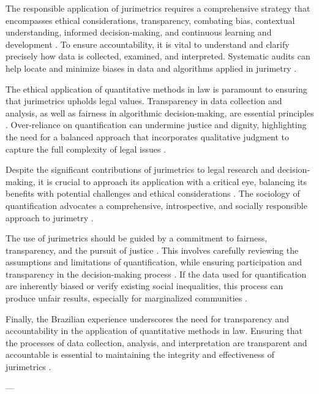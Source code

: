 The responsible application of jurimetrics requires a comprehensive strategy that encompasses ethical considerations, transparency, combating bias, contextual understanding, informed decision-making, and continuous learning and development \cite{10.1590/data.2022.65.3.267,inthelawviewmetadatacitationsimilarpapers2014}. To ensure accountability, it is vital to understand and clarify precisely how data is collected, examined, and interpreted. Systematic audits can help locate and minimize biases in data and algorithms applied in jurimetry \cite{10.1590/data.2022.65.3.267,inthelawviewmetadatacitationsimilarpapers2014}.

The ethical application of quantitative methods in law is paramount to ensuring that jurimetrics upholds legal values. Transparency in data collection and analysis, as well as fairness in algorithmic decision-making, are essential principles \cite{internalknowledgesources}. Over-reliance on quantification can undermine justice and dignity, highlighting the need for a balanced approach that incorporates qualitative judgment to capture the full complexity of legal issues \cite{internalknowledgesources}.

Despite the significant contributions of jurimetrics to legal research and decision-making, it is crucial to approach its application with a critical eye, balancing its benefits with potential challenges and ethical considerations \cite{10.1007/s11186-021-09453-1,10.1057/s41599-020-00557-0,10.1590/15174522-105471,10.1590/data.2022.65.3.267,10.3390/fi9040068,international2015,loevinger1959,10.2307/2654208,demortain2019politics,10.5040/9781350220645,10.1080/07329113.2015.1046739,10.1057/s41599-020-0396-5,comptabilitat0018,salais2016quantification,10.1017/s0003975609000150,supiot2018,nunes2016jurimetrics,de2010jurimetrics,zabala2019decades}. The sociology of quantification advocates a comprehensive, introspective, and socially responsible approach to jurimetry \cite{10.1590/data.2022.65.3.267,salais2016quantification}.

The use of jurimetrics should be guided by a commitment to fairness, transparency, and the pursuit of justice \cite{10.1177/09596801221075807,10.5040/9781350220645}. This involves carefully reviewing the assumptions and limitations of quantification, while ensuring participation and transparency in the decision-making process \cite{10.1590/data.2022.65.3.267,10.1057/s41599-020-00557-0}. If the data used for quantification are inherently biased or verify existing social inequalities, this process can produce unfair results, especially for marginalized communities \cite{10.1590/data.2022.65.3.267,10.1057/s41599-020-00557-0}.

Finally, the Brazilian experience underscores the need for transparency and accountability in the application of quantitative methods in law. Ensuring that the processes of data collection, analysis, and interpretation are transparent and accountable is essential to maintaining the integrity and effectiveness of jurimetrics \cite{10.1590/data.2022.65.3.267,in the lawviewmetadatacitationsimilarpapers2014}.


---
